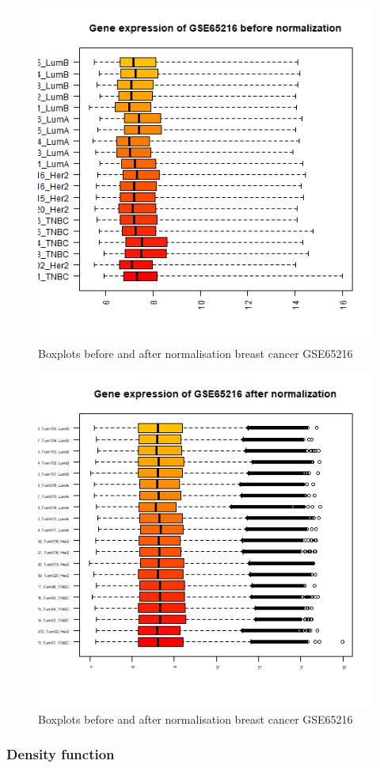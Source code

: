 \documentclass[
]{article}
\begin{document}
\begin{figure}

{\centering \includegraphics[width=0.5\linewidth]{images/breast_box_bfnorm} 

}

\caption{Boxplots before and after normalisation breast cancer GSE65216}\label{fig:Boxplots - breast qc-1}
\end{figure}
\begin{figure}

{\centering \includegraphics[width=0.5\linewidth]{images/breast_box_afnorm} 

}

\caption{Boxplots before and after normalisation breast cancer GSE65216}\label{fig:Boxplots - breast qc-2}
\end{figure}

\hypertarget{density-function}{%
\subsubsection{Density function}\label{density-function}}
\end{document}
